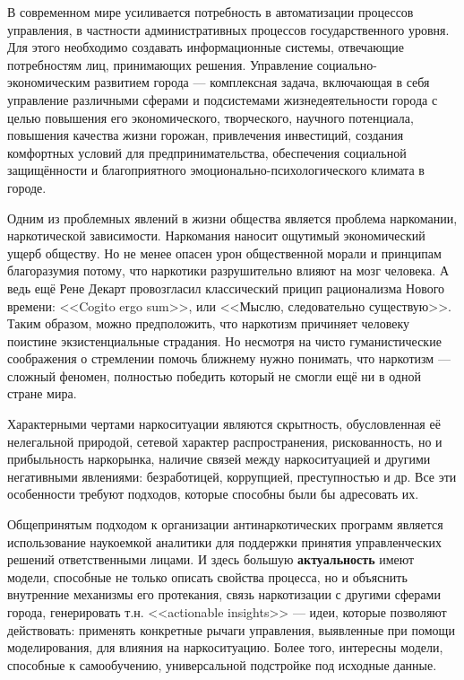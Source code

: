 В современном мире усиливается потребность в автоматизации процессов управления,
в частности административных процессов государственного уровня. Для этого
необходимо создавать информационные системы, отвечающие потребностям лиц,
принимающих решения. Управление социально-экономическим развитием города ---
комплексная задача, включающая в себя управление различными сферами и
подсистемами жизнедеятельности города с целью повышения его экономического,
творческого, научного потенциала, повышения качества жизни горожан, привлечения
инвестиций, создания комфортных условий для предпринимательства, обеспечения
социальной защищённости и благоприятного эмоционально-психологического климата в
городе.

Одним из проблемных явлений в жизни общества является проблема наркомании,
наркотической зависимости. Наркомания наносит ощутимый экономический ущерб
обществу. Но не менее опасен урон общественной морали и принципам благоразумия 
потому, что наркотики разрушительно влияют на мозг человека. А ведь ещё Рене
Декарт провозгласил классический прицип рационализма Нового времени: <<Cogito
ergo sum>>, или <<Мыслю, следовательно существую>>. Таким образом, можно
предположить, что наркотизм причиняет человеку поистине экзистенциальные
страдания. Но несмотря на чисто гуманистические соображения о стремлении помочь
ближнему нужно понимать, что наркотизм --- сложный феномен, полностью победить
который не смогли ещё ни в одной стране мира.

Характерными чертами наркоситуации являются скрытность, обусловленная
её нелегальной природой, сетевой характер распространения, рискованность, но и
прибыльность наркорынка, наличие связей между наркоситуацией и другими
негативными явлениями: безработицей, коррупцией, преступностью и др. Все эти
особенности требуют подходов, которые способны были бы адресовать их.

Общепринятым подходом к организации антинаркотических программ является
использование наукоемкой аналитики для поддержки принятия управленческих решений
ответственными лицами. И здесь большую \textbf{актуальность} имеют модели,
способные не только описать свойства процесса, но и объяснить внутренние
механизмы его протекания, связь наркотизации с другими сферами города,
генерировать т.н.  <<actionable insights>> --- идеи, которые позволяют
действовать: применять конкретные рычаги управления, выявленные при помощи
моделирования, для влияния на наркоситуацию. Более того, интересны модели,
способные к самообучению, универсальной подстройке под исходные данные.

